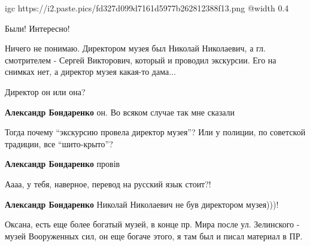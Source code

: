  
 
 
 
 

\qqSecCmt


\ifcmt
  igc https://i2.paste.pics/fd327d099d7161d5977b262812388f13.png
	@width 0.4
\fi


Были! Интересно!


Ничего не понимаю. Директором музея был Николай Николаевич, а гл. смотрителем -
Сергей Викторович, который и проводил экскурсии. Его на снимках нет, а директор
музея какая-то дама... 

\begin{itemize} %

Директор он или она?

\textbf{Александр Бондаренко} он. Во всяком случае так мне сказали


Тогда почему \enquote{экскурсию провела директор музея}? Или у полиции, по
советской традиции, все \enquote{шито-крыто}?

\textbf{Александр Бондаренко} провів


Аааа, у тебя, наверное, перевод на русский язык стоит?!

\textbf{Александр Бондаренко} Николай Николаевич не був директором музея)))!
\end{itemize} %


Оксана, есть еще более богатый музей, в конце пр. Мира после ул. Зелинского -
музей Вооруженных сил, он еще богаче этого, я там был и писал материал в ПР. 


